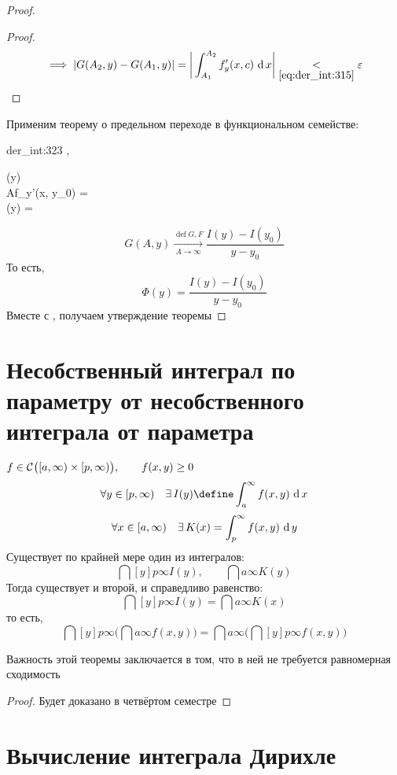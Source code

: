 \begin{proof}
\begin{proof}
		$$ \implies |G(A_2, y) - G(A_1, y)| = \bigg| \dint{A_1}{A_2}{f_y'(x, c)} \bigg| \underset{\eref{der_int:315}}< \veps $$
	\end{proof}
	Применим теорему о предельном переходе в функциональном семействе:
	\begin{equ}{der_int:323}
		,  \implies
		\begin{cases}
			\exist {} \Phi(y) \\
			\exist {} A{f_y'(x, y_0)} =  \\
			 \Phi(y) = 
		\end{cases}
	\end{equ}
	$$ G(A, y) \xrightarrow[A \to \infty]{\operatorname{def} G, F} \frac{I(y) - I(y_0)}{y - y_0} $$
	То есть,
	$$ \Phi(y) = \frac{I(y) - I(y_0)}{y - y_0} $$
	Вместе с , получаем утверждение теоремы
\end{proof}

\section{Несобственный интеграл по параметру от несобственного интеграла от параметра}

\begin{theorem}
	$ f \in \Cont{[a, \infty) \times [p, \infty)}, \qquad f(x, y) \ge 0 $
	$$ \forall y \in [p, \infty) \quad \exist I(y) \define \dint{a}\infty{f(x, y)} $$
	$$ \forall x \in [a, \infty) \quad \exist K(x) = \dint[y]p\infty{f(x, y)} $$
	Существует по крайней мере один из интегралов:
	$$ \dint[y]p\infty{I(y)}, \qquad \dint{a}\infty{K(y)} $$
	Тогда существует и второй, и справедливо равенство:
	$$ \dint[y]p\infty{I(y)} = \dint{a}\infty{K(x)} $$
	то есть,
	$$ \dint[y]p\infty{\bigg( \dint{a}\infty{f(x, y)} \bigg)} = \dint{a}\infty{\bigg( \dint[y]p\infty{f(x, y)} \bigg)} $$
\end{theorem}

\begin{remark}
	Важность этой теоремы заключается в том, что в ней не требуется равномерная сходимость
\end{remark}

\begin{proof}
	Будет доказано в четвёртом семестре
\end{proof}

\section{Вычисление интеграла Дирихле}

